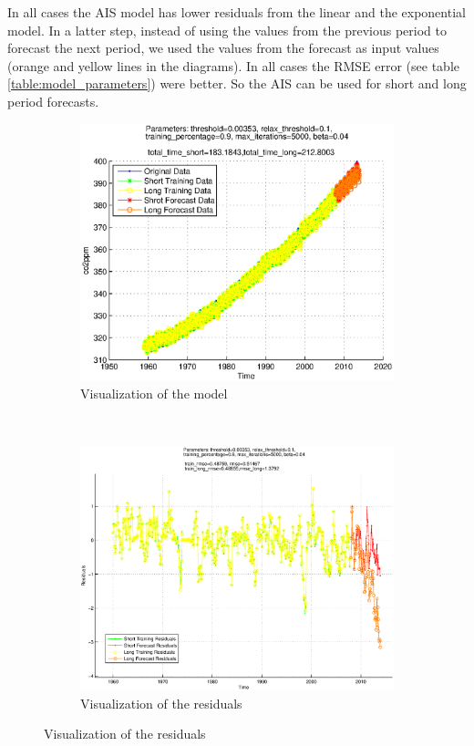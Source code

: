 \documentclass{assignment}
\begin{document}
In all cases the AIS model has lower residuals from the linear and the exponential model. In a latter step, instead of using the values from the previous period to forecast the next period, we used the values from the forecast as input values (orange and yellow lines in the diagrams). In all cases the RMSE error (see table \ref{table:model_parameters}) were better. So the AIS can be used for short and long period forecasts.

\begin{figure}
  \centering
  \begin{subfigure}[b]{0.51\textwidth}
     \includegraphics[width=\textwidth]{images/ais_visualization.eps}
  \caption{Visualization of the model}
  \end{subfigure}%
   ~ %
  \begin{subfigure}[b]{0.51\textwidth}
    \includegraphics[width=\textwidth]{images/ais_residuals.eps}
  \caption{Visualization of the residuals}
  \end{subfigure}


\end{figure}
\end{document}
